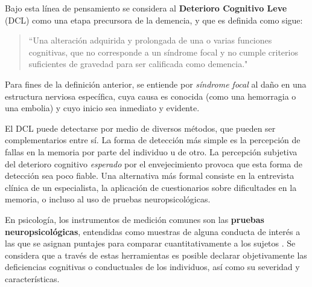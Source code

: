 %
%

Bajo esta línea de pensamiento se considera al \textbf{Deterioro Cognitivo Leve} (DCL) como una etapa precursora de la demencia, y que es definida como sigue: 
\begin{quote}
``Una alteración adquirida y prolongada de una o varias funciones cognitivas, que no corresponde a un 
síndrome focal y no cumple criterios suficientes de gravedad para ser calificada como demencia."
\cite{Robles02}
\end{quote}

Para fines de la definición anterior, se entiende por \textit{síndrome focal} al daño en una estructura nerviosa específica, cuya causa es conocida (como una hemorragia o una embolia) y cuyo inicio sea inmediato y evidente. 
%

El DCL puede detectarse por medio de diversos métodos, que pueden ser complementarios entre sí. 
%
La forma de detección más simple es la percepción de fallas en la memoria por parte del individuo u de otro. 
%
La percepción subjetiva del deterioro cognitivo \textit{esperado} por el envejecimiento provoca que esta forma de detección sea poco fiable.
Una alternativa más {formal} consiste en la entrevista clínica de un especialista, la aplicación de cuestionarios sobre dificultades en la memoria, o incluso al uso de pruebas neuropsicológicas. 
%

En psicología, los instrumentos de medición comunes son las \textbf{pruebas neuropsicológicas}, 
entendidas como muestras de alguna conducta de interés a las que se asignan puntajes para comparar 
cuantitativamente a los sujetos \cite{Ardila12}.
%
Se considera que a través de estas herramientas es posible declarar objetivamente las deficiencias cognitivas o conductuales de los individuos, así como su severidad y características.

